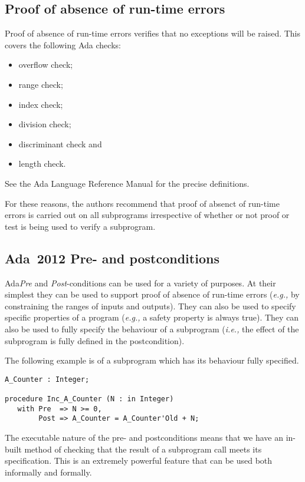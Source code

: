 \documentclass{llncs}
\newcommand{\ada}{Ada\xspace}
\newcommand{\adatwtw}{Ada~2012\xspace}
\newcommand{\ie}{\textit{i.e.,}\xspace}
\newcommand{\eg}{\textit{e.g.,}\xspace}
\begin{document}
\subsection{Proof of absence of run-time errors}

Proof of absence of run-time errors verifies that no exceptions will
be raised. This covers the following Ada checks:

\begin{itemize}
\item overflow check;
\item range check;
\item index check;
\item division check;
\item discriminant check and
\item length check.
\end{itemize}

See the Ada Language Reference Manual for the precise definitions.

For these reasons, the authors recommend that proof of absenct of
run-time errors is carried out on all subprograms irrespective of
whether or not proof or test is being used to verify a subprogram.

\subsection{\adatwtw Pre- and postconditions}

\ada \emph{Pre} and \emph{Post}-conditions can be used for a variety
of purposes. At their simplest they can be used to support proof of
absence of run-time errors (\eg by constraining the ranges of inputs
and outputs). They can also be used to specify specific properties of
a program (\eg a safety property is always true). They can also be
used to fully specify the behaviour of a subprogram (\ie the effect of
the subprogram is fully defined in the postcondition).

The following example is of a subprogram which has its behaviour fully
specified.

\begin{lstlisting}[language=SPARK]
A_Counter : Integer;

procedure Inc_A_Counter (N : in Integer)
   with Pre  => N >= 0,
        Post => A_Counter = A_Counter'Old + N;
\end{lstlisting}

The executable nature of the pre- and postconditions means that we
have an in-built method of checking that the result of a subprogram
call meets its specification. This is an extremely powerful feature
that can be used both informally and formally.
\end{document}
